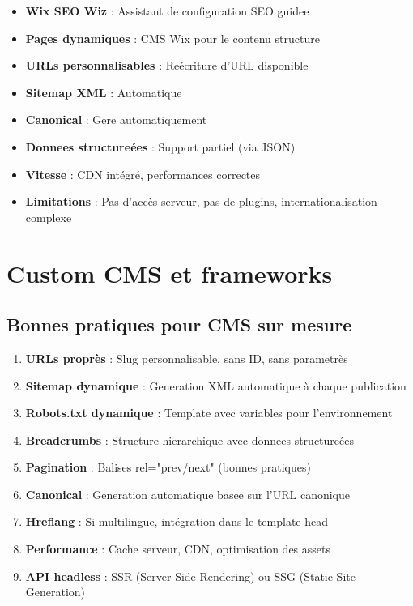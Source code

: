\begin{itemize}
    \item \textbf{Wix SEO Wiz} : Assistant de configuration SEO guidee
    \item \textbf{Pages dynamiques} : CMS Wix pour le contenu structure
    \item \textbf{URLs personnalisables} : Reécriture d'URL disponible
    \item \textbf{Sitemap XML} : Automatique
    \item \textbf{Canonical} : Gere automatiquement
    \item \textbf{Donnees structureées} : Support partiel (via JSON)
    \item \textbf{Vitesse} : CDN intégré, performances correctes
    \item \textbf{Limitations} : Pas d'accès serveur, pas de plugins, internationalisation complexe
\end{itemize}

\section{Custom CMS et frameworks}

\subsection{Bonnes pratiques pour CMS sur mesure}

\begin{enumerate}
    \item \textbf{URLs proprès} : Slug personnalisable, sans ID, sans parametrès
    \item \textbf{Sitemap dynamique} : Generation XML automatique à chaque publication
    \item \textbf{Robots.txt dynamique} : Template avec variables pour l'environnement
    \item \textbf{Breadcrumbs} : Structure hierarchique avec donnees structureées
    \item \textbf{Pagination} : Balises rel="prev/next" (bonnes pratiques)
    \item \textbf{Canonical} : Generation automatique basee sur l'URL canonique
    \item \textbf{Hreflang} : Si multilingue, intégration dans le template head
    \item \textbf{Performance} : Cache serveur, CDN, optimisation des assets
    \item \textbf{API headless} : SSR (Server-Side Rendering) ou SSG (Static Site Generation)
\end{enumerate}

